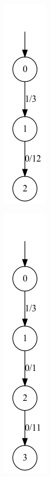 \begin{figure}[h]
    \centering
    \begin{subfigure}{.15\textwidth}
        \centering
        \includegraphics[scale=0.3]{obrazky-figures/proj_img2.png}
        \caption{}
        \label{proj_img2}
    \end{subfigure}
    \hfil
    \begin{subfigure}{.15\textwidth}
        \centering
        \includegraphics[scale=0.3]{obrazky-figures/proj_img3.png}

\end{subfigure}
\end{figure}
